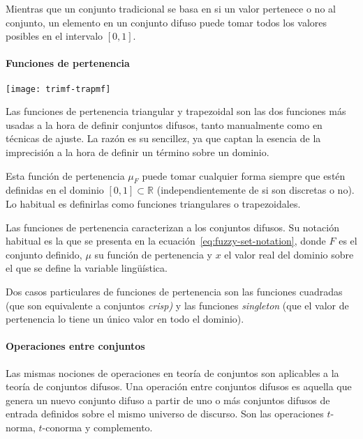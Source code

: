 Mientras que un conjunto tradicional se basa en si un valor pertenece o no al conjunto, un elemento en un conjunto difuso puede tomar todos los valores posibles en el intervalo $[0, 1]$.

\paragraph{Funciones de pertenencia}

\begin{marginfigure}
	\centering
	\texttt{[image: trimf-trapmf]}
	\caption[Gráfica de funciones de pertenencia triangular y trapezoidal]{Las funciones de pertenencia triangular y trapezoidal son las dos funciones más usadas a la hora de definir conjuntos difusos, tanto manualmente como en técnicas de ajuste. La razón es su sencillez, ya que captan la esencia de la imprecisión a la hora de definir un término sobre un dominio.}
	\label{fig:trimf-trapmf}
\end{marginfigure}

Esta función de pertenencia $\mu_F$ puede tomar cualquier forma siempre que estén definidas en el dominio $[0, 1] \subset \mathbb{R}$ (independientemente de si son discretas o no). Lo habitual es definirlas como funciones triangulares o trapezoidales.

Las funciones de pertenencia caracterizan a los conjuntos difusos. Su notación habitual es la que se presenta en la ecuación~\ref{eq:fuzzy-set-notation}, donde $F$ es el conjunto definido, $\mu$ su función de pertenencia y $x$ el valor real del dominio sobre el que se define la variable lingüística.

Dos casos particulares de funciones de pertenencia son las funciones cuadradas (que son equivalente a conjuntos \textit{crisp)} y las funciones \textit{singleton} (que el valor de pertenencia lo tiene un único valor en todo el dominio).

\paragraph{Operaciones entre conjuntos}

Las mismas nociones de operaciones en teoría de conjuntos son aplicables a la teoría de conjuntos difusos. Una operación entre conjuntos difusos es aquella que genera un nuevo conjunto difuso a partir de uno o más conjuntos difusos de entrada definidos sobre el mismo universo de discurso. Son las operaciones $t$-norma, $t$-conorma y complemento.

